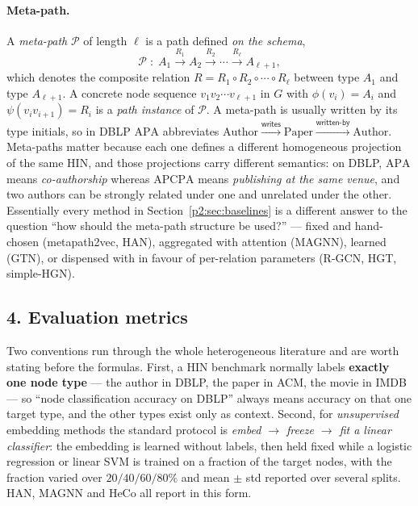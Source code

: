 \paragraph{Meta-path.}
A \emph{meta-path} $\mathcal{P}$ of length $\ell$ is a path defined \emph{on the schema},
\[
  \mathcal{P}\;:\;A_1\xrightarrow{R_1}A_2\xrightarrow{R_2}\cdots\xrightarrow{R_\ell}A_{\ell+1},
\]
which denotes the composite relation $R=R_1\circ R_2\circ\cdots\circ R_\ell$ between type $A_1$ and
type $A_{\ell+1}$. A concrete node sequence $v_1v_2\cdots v_{\ell+1}$ in $G$ with
$\phi(v_i)=A_i$ and $\psi(v_iv_{i+1})=R_i$ is a \emph{path instance} of $\mathcal{P}$. A meta-path
is usually written by its type initials, so in DBLP $\mathrm{APA}$ abbreviates
$\text{Author}\xrightarrow{\textsf{writes}}\text{Paper}\xrightarrow{\textsf{written-by}}\text{Author}$.
Meta-paths matter because each one defines a different homogeneous projection of the same HIN, and
those projections carry different semantics: on DBLP, $\mathrm{APA}$ means \emph{co-authorship}
whereas $\mathrm{APCPA}$ means \emph{publishing at the same venue}, and two authors can be strongly
related under one and unrelated under the other. Essentially every method in
Section~\ref{p2:sec:baselines} is a different answer to the question ``how should the meta-path
structure be used?'' --- fixed and hand-chosen (metapath2vec, HAN), aggregated with attention
(MAGNN), learned (GTN), or dispensed with in favour of per-relation parameters (R-GCN, HGT,
simple-HGN).

\subsection*{4. Evaluation metrics}

Two conventions run through the whole heterogeneous literature and are worth stating before the
formulas. First, a HIN benchmark normally labels \textbf{exactly one node type} --- the author in
DBLP, the paper in ACM, the movie in IMDB --- so ``node classification accuracy on DBLP'' always
means accuracy on that one target type, and the other types exist only as context. Second, for
\emph{unsupervised} embedding methods the standard protocol is
\emph{embed $\to$ freeze $\to$ fit a linear classifier}: the embedding is learned without labels,
then held fixed while a logistic regression or linear SVM is trained on a fraction of the target
nodes, with the fraction varied over $20/40/60/80\%$ and mean $\pm$ std reported over several
splits. HAN, MAGNN and HeCo all report in this form.

